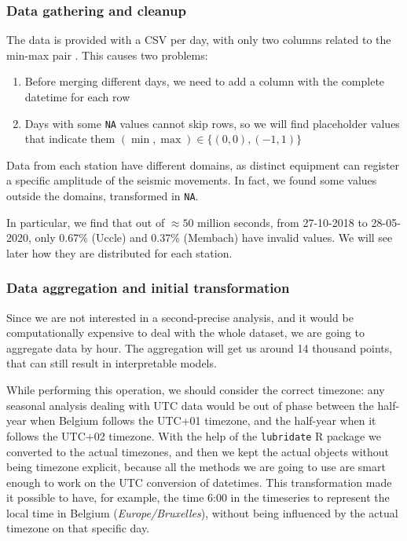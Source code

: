 \documentclass[12pt]{article}
\begin{document}
\subsubsection{Data gathering and cleanup}
The data is provided with a CSV per day, with only two columns related to the min-max pair \cite{Data20200402}. This causes two problems:
\begin{enumerate}[topsep=0.5em,itemsep=0em,partopsep=0.5em]
	\item Before merging different days, we need to add a column with the complete datetime for each row
	\item Days with some \texttt{NA} values cannot skip rows, so we will find placeholder values that indicate them $(\min, \max) \in \{(0,0), (-1,1)\}$
\end{enumerate}

Data from each station have different domains, as distinct equipment can register a specific amplitude of the seismic movements. In fact, we found some values outside the domains, transformed in \texttt{NA}.

In particular, we find that out of $\approx50$ million seconds, from 27-10-2018 to 28-05-2020, only 0.67\% (Uccle) and 0.37\% (Membach) have invalid values. We will see later how they are distributed for each station.



\subsubsection{Data aggregation and initial transformation}
Since we are not interested in a second-precise analysis, and it would be computationally expensive to deal with the whole dataset, we are going to aggregate data by hour. The aggregation will get us around 14 thousand points, that can still result in interpretable models.

While performing this operation, we should consider the correct timezone: any seasonal analysis dealing with UTC data would be out of phase between the half-year when Belgium follows the UTC+01 timezone, and the half-year when it follows the UTC+02 timezone. With the help of the \texttt{lubridate} R package we converted to the actual timezones, and then we kept the actual objects without being timezone explicit, because all the methods we are going to use are smart enough to work on the UTC conversion of datetimes. This transformation made it possible to have, for example, the time 6:00 in the timeseries to represent the local time in Belgium (\textit{Europe/Bruxelles}), without being influenced by the actual timezone on that specific day.
\end{document}
